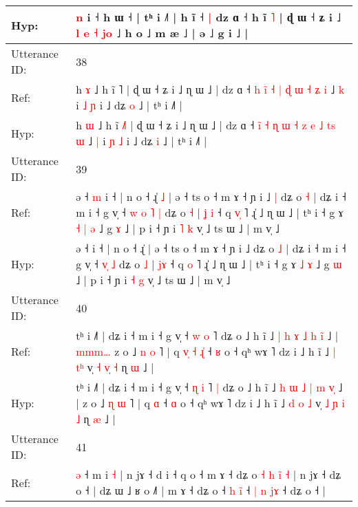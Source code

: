 \documentclass[10pt]{article}
\DeclareRobustCommand{\hl}[1]{{\textcolor{red}{#1}}}
\begin{document}
\begin{longtable}{ll}
Hyp: & \hl{n} i ˧ h ɯ ˧ | tʰ i ˩˥ | h ĩ ˧\hl{ }\hl{|} dz ɑ ˧ h ĩ \hl{˥} | ɖ ɯ ˧ ʑ i ˩ \hl{}\hl{l} \hl{e} \hl{˧} \hl{}\hl{j}\hl{o} ˩ h o\hl{}\hl{}\hl{}\hl{}\hl{}\hl{} ˩ m æ ˩ | ə ˩ g i ˩ |
 \\
\midrule
Utterance ID: & 38 \\
Ref: & h \hl{ɤ} ˩ h ĩ \hl{}˥ | ɖ ɯ ˧ ʑ i ˩ ɳ ɯ ˩ | dz ɑ ˧ \hl{}\hl{h} \hl{}\hl{i}\hl{̃} \hl{˧} \hl{|} \hl{ɖ} \hl{ɯ} \hl{˧} \hl{}\hl{ʑ} \hl{i} ˩ \hl{k} i \hl{˩} \hl{ɲ} i ˩ dʑ \hl{o} ˩ | tʰ i ˩˥ |
 \\
Hyp: & h \hl{ɯ} ˩ h ĩ \hl{˩}˥ | ɖ ɯ ˧ ʑ i ˩ ɳ ɯ ˩ | dz ɑ ˧ \hl{i}\hl{̃} \hl{˧}\hl{ }\hl{ɳ} \hl{ɯ} \hl{˧} \hl{z} \hl{e} \hl{˩} \hl{t}\hl{s} \hl{ɯ} ˩ \hl{|} i \hl{ɲ} \hl{˩} i ˩ dʑ \hl{i} ˩ | tʰ i ˩˥ |
 \\
\midrule
Utterance ID: & 39 \\
Ref: & ə ˧\hl{ }\hl{m} i ˧ | n o ˧ ɻ̍\hl{ }\hl{˩} | ə ˧ ts o ˧ m ɤ ˧ ɲ i ˩\hl{ }\hl{|} dʑ o \hl{˧} | dʑ i ˧ m i ˧ g v̩ ˧\hl{ }\hl{w} \hl{o}\hl{ }\hl{˥} \hl{|} dʑ o \hl{˧} | \hl{ʝ}\hl{ }\hl{i} ˧ q \hl{v}\hl{̩} ˥ ɻ̍ ˩ ɳ ɯ ˩ | tʰ i ˧ g ɤ\hl{ }\hl{˧} \hl{|} \hl{ə} ˩ g \hl{ɤ} ˩ | p i ˧ ɲ i \hl{˥} \hl{k} v̩ ˩ ts ɯ ˩ | m v̩ ˩
 \\
Hyp: & ə ˧\hl{}\hl{} i ˧ | n o ˧ ɻ̍\hl{}\hl{} | ə ˧ ts o ˧ m ɤ ˧ ɲ i ˩\hl{}\hl{} dʑ o \hl{˩} | dʑ i ˧ m i ˧ g v̩ ˧\hl{}\hl{} \hl{}\hl{v}\hl{̩} \hl{˩} dʑ o \hl{˩} | \hl{}\hl{j}\hl{ɤ} ˧ q \hl{}\hl{o} ˥ ɻ̍ ˩ ɳ ɯ ˩ | tʰ i ˧ g ɤ\hl{}\hl{} \hl{˩} \hl{ɤ} ˩ g \hl{ɯ} ˩ | p i ˧ ɲ i \hl{˧} \hl{g} v̩ ˩ ts ɯ ˩ | m v̩ ˩
 \\
\midrule
Utterance ID: & 40 \\
Ref: & tʰ i ˩˥ | dʑ i ˧ m i ˧ g v̩ ˧ \hl{w} \hl{o} ˥\hl{}\hl{} dʑ o ˩ h ĩ ˩ \hl{|} \hl{h} \hl{ɤ} \hl{˩} \hl{h} \hl{i}\hl{̃} ˩ |\hl{ }\hl{m}\hl{m}\hl{m}\hl{…} z o ˩ \hl{n} \hl{o} ˥ | q\hl{ }\hl{v}\hl{̩}\hl{ }\hl{˧} \hl{ɻ}\hl{̍} ˧ \hl{ʁ} o ˧ qʰ wɤ ˥ dz i ˩ h ĩ ˩ \hl{|} \hl{}\hl{t}\hl{ʰ} v̩ \hl{˧} \hl{}\hl{v}\hl{̩} \hl{˧} ɳ \hl{ɯ} ˩ |
 \\
Hyp: & tʰ i ˩˥ | dʑ i ˧ m i ˧ g v̩ ˧ \hl{ɳ} \hl{i} ˥\hl{ }\hl{|} dʑ o ˩ h ĩ ˩ \hl{h} \hl{ɯ} \hl{˩} \hl{|} \hl{m} \hl{v}\hl{̩} ˩ |\hl{}\hl{}\hl{}\hl{}\hl{} z o ˩ \hl{ɳ} \hl{ɯ} ˥ | q\hl{}\hl{}\hl{}\hl{}\hl{} \hl{}\hl{ɑ} ˧ \hl{ɑ} o ˧ qʰ wɤ ˥ dz i ˩ h ĩ ˩ \hl{d} \hl{o}\hl{ }\hl{˩} v̩ \hl{˩} \hl{ɲ}\hl{ }\hl{i} \hl{˩} ɳ \hl{æ} ˩ |
 \\
\midrule
Utterance ID: & 41 \\
Ref: & \hl{}\hl{ə} ˧ m i \hl{˧} | n jɤ ˧ d i ˧ q o ˧ m ɤ ˧ dʑ o\hl{ }\hl{˧}\hl{ }\hl{h}\hl{ }\hl{i}\hl{̃} \hl{˧} | n jɤ ˧ dʑ o ˧ | dʑ ɯ ˩ ʁ o ˩˥ | m ɤ ˧ dʑ o ˧ \hl{h} \hl{}\hl{i}\hl{̃} ˧ \hl{|} \hl{n} \hl{}\hl{j}\hl{ɤ} ˧ dʑ o ˧\hl{} |

\end{longtable}
\end{document}
